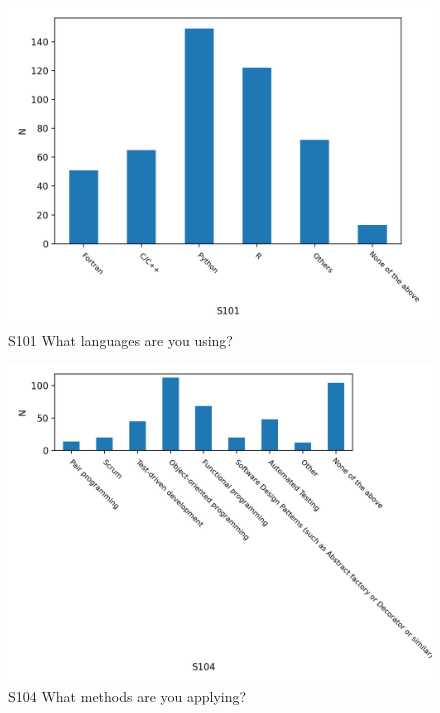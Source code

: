 \documentclass{article}
\begin{document}
\begin{figure}[!p]
    \centering
    \includegraphics[width=\textwidth]{../figs/S101.png}
	\caption{S101 What languages are you using?}
    \label{fig:S101}
\end{figure}

\begin{figure}[!p]
    \centering
    \includegraphics[width=\textwidth]{../figs/S104.png}
	\caption{S104 What methods are you applying?}
    \label{fig:S104}
\end{figure}
\end{document}
